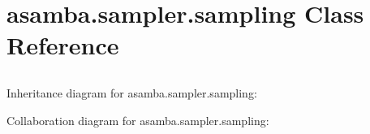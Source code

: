 \hypertarget{classasamba_1_1sampler_1_1sampling}{}\section{asamba.\+sampler.\+sampling Class Reference}
\label{classasamba_1_1sampler_1_1sampling}


\paragraph*{}

\subsection*{}

\subsection*{}

\subsection*{}

\subsection*{}

\subsection*{}

\subparagraph*{} 




Inheritance diagram for asamba.\+sampler.\+sampling\+:


Collaboration diagram for asamba.\+sampler.\+sampling\+:
